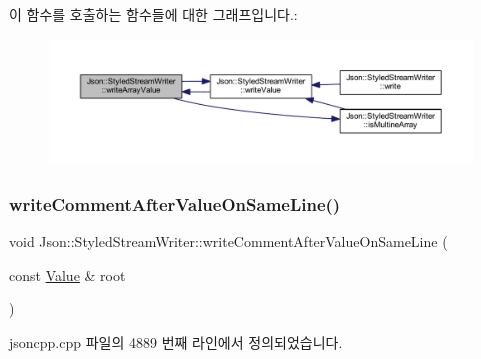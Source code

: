 이 함수를 호출하는 함수들에 대한 그래프입니다.\+:\nopagebreak
\begin{figure}[H]
\begin{center}
\leavevmode
\includegraphics[width=350pt]{class_json_1_1_styled_stream_writer_a606f2ddd58093c9b019d452c1b6f09fe_icgraph}
\end{center}
\end{figure}
\mbox{\label{class_json_1_1_styled_stream_writer_ad2ca860e317ca91d6b2932535b4ce9c7}} 
\subsubsection{\texorpdfstring{write\+Comment\+After\+Value\+On\+Same\+Line()}{writeCommentAfterValueOnSameLine()}}
{\footnotesize\ttfamily void Json\+::\+Styled\+Stream\+Writer\+::write\+Comment\+After\+Value\+On\+Same\+Line (\begin{DoxyParamCaption}\item[{const \hyperlink{class_json_1_1_value}{Value} \&}]{root }\end{DoxyParamCaption})\hspace{0.3cm}{\ttfamily [private]}}



jsoncpp.\+cpp 파일의 4889 번째 라인에서 정의되었습니다.



